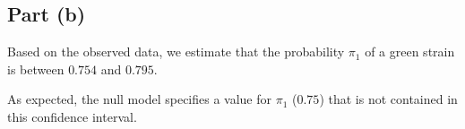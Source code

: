 \documentclass[
]{article}
\begin{document}
\hypertarget{part-b-1}{%
\subsection{Part (b)}\label{part-b-1}}


Based on the observed data, we estimate that the probability \(\pi_1\)
of a green strain is between \(0.754\) and \(0.795\).

As expected, the null model specifies a value for \(\pi_1\) (\(0.75\))
that is not contained in this confidence interval.
\end{document}
